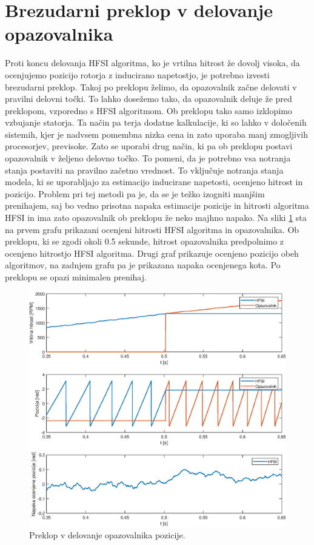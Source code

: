 \documentclass[a4paper,twoside,openright,12pt,slovene]{book}
\begin{document}
\section{Brezudarni preklop v delovanje opazovalnika}

Proti koncu delovanja HFSI algoritma, ko je vrtilna hitrost že dovolj visoka, da ocenjujemo pozicijo rotorja z inducirano napetostjo, je potrebno izvesti brezudarni preklop. Takoj po preklopu želimo,
da opazovalnik začne delovati v pravilni delovni točki. To lahko dosežemo tako, da opazovalnik deluje že pred preklopom, vzporedno s HFSI algoritmom. Ob preklopu tako samo izklopimo vzbujanje
statorja. Ta način pa terja dodatne kalkulacije, ki so lahko v določenih sistemih, kjer je nadvsem pomembna nizka cena in zato uporaba manj zmogljivih procesorjev, previsoke. Zato se uporabi drug
način, ki pa ob preklopu postavi opazovalnik v željeno delovno točko. To pomeni, da je potrebno vsa notranja stanja postaviti na pravilno začetno vrednost. To vključuje notranja stanja modela, ki se
uporabljajo za estimacijo inducirane napetosti, ocenjeno hitrost in pozicijo. Problem pri tej metodi pa je, da se je težko izogniti manjšim prenihajem, saj bo vedno prisotna napaka estimacije
pozicije in hitrosti algoritma HFSI in ima zato opazovalnik ob preklopu že neko majhno napako. Na sliki \ref{brezudarniPreklop} sta na prvem grafu prikazani ocenjeni hitrosti HFSI algoritma in
opazovalnika. Ob preklopu, ki se zgodi okoli 0.5 sekunde, hitrost opazovalnika predpolnimo z ocenjeno hitrostjo HFSI algoritma. Drugi graf prikazuje ocenjeno pozicijo obeh algoritmov, na zadnjem grafu
pa je prikazana napaka ocenjenega kota. Po preklopu se opazi minimalen prenihaj.

\begin{figure}[!htbp]
    \centering
    \includegraphics[width=1\columnwidth]{Slike/brezudarniPreklop.eps}
    \caption{\label{brezudarniPreklop} Preklop v delovanje opazovalnika pozicije. }
\end{figure}
\end{document}

